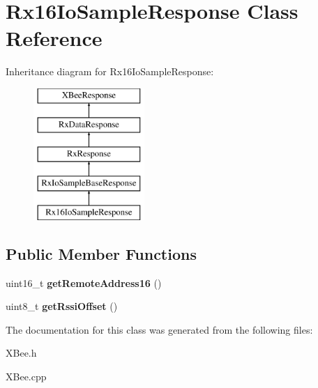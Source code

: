 \hypertarget{classRx16IoSampleResponse}{\section{\-Rx16\-Io\-Sample\-Response \-Class \-Reference}
\label{classRx16IoSampleResponse}
}
\-Inheritance diagram for \-Rx16\-Io\-Sample\-Response\-:\begin{figure}[H]
\begin{center}
\leavevmode
\includegraphics[height=5.000000cm]{classRx16IoSampleResponse}
\end{center}
\end{figure}
\subsection*{\-Public \-Member \-Functions}
\begin{DoxyCompactItemize}
\item 
\hypertarget{classRx16IoSampleResponse_ab35f8039eebc6c969563f769fdae8f21}{uint16\-\_\-t {\bfseries get\-Remote\-Address16} ()}\label{classRx16IoSampleResponse_ab35f8039eebc6c969563f769fdae8f21}

\item 
\hypertarget{classRx16IoSampleResponse_a3b3437d05701cdaf86bc54a5a2acb026}{uint8\-\_\-t {\bfseries get\-Rssi\-Offset} ()}\label{classRx16IoSampleResponse_a3b3437d05701cdaf86bc54a5a2acb026}

\end{DoxyCompactItemize}


\-The documentation for this class was generated from the following files\-:\begin{DoxyCompactItemize}
\item 
\-X\-Bee.\-h\item 
\-X\-Bee.\-cpp\end{DoxyCompactItemize}
